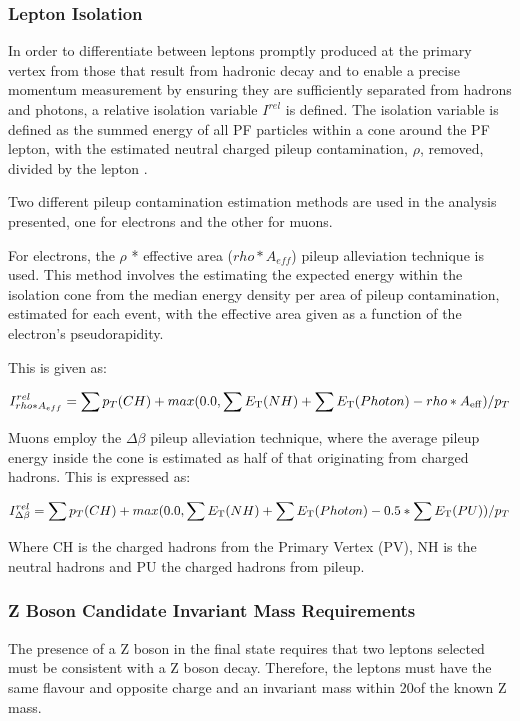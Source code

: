 \cite{Chatrchyan:2012xi}


\subsubsection{Lepton Isolation}
In order to differentiate between leptons promptly produced at the primary vertex from those that result from hadronic decay and to enable a precise momentum measurement by ensuring they are sufficiently separated from hadrons and photons, a relative isolation variable $I^{rel}$ is defined.
The isolation variable is defined as the summed energy of all PF particles within a cone around the PF lepton, with the estimated neutral charged pileup contamination, $\rho$, removed, divided by the lepton \pT.

Two different pileup contamination estimation methods are used in the analysis presented, one for electrons and the other for muons.

For electrons, the $\rho$ * effective area ($rho * A_{eff}$) pileup alleviation technique is used.
This method involves the estimating the expected energy within the isolation cone from the median energy density per area of pileup contamination, estimated for each event, with the effective area given as a function of the electron's pseudorapidity.

This is given as: 

\begin{equation}
I^{rel}_{rho * A_{eff}} = \sum p_T(CH) + max (0.0, \sum E_{\rm T}(NH) + \sum E_{\rm T}(Photon) -rho*A_{\rm eff} )/p_T \\
\end{equation}\label{eq:rhoEffA}

Muons employ the $\Delta\beta$ pileup alleviation technique, where the average pileup energy inside the cone is estimated as half of that originating from charged hadrons.
This is expressed as:

\begin{equation}
I^{rel}_{\Delta\beta} = \sum p_T(CH) + max (0.0, \sum E_{\rm T}(NH) + \sum E_{\rm T}(Photon) - 0.5 * \sum E_{\rm T}(PU))/p_T \\
\end{equation}\label{eq:deltaBeta}

Where CH is the charged hadrons from the Primary Vertex (PV), NH is the neutral hadrons and PU the charged hadrons from pileup.

\subsubsection{Z Boson Candidate Invariant Mass Requirements}
The presence of a Z boson in the final state requires that two leptons selected must be consistent with a Z boson decay.
Therefore, the leptons must have the same flavour and opposite charge and an invariant mass within 20\GeVcc of the known Z mass.

